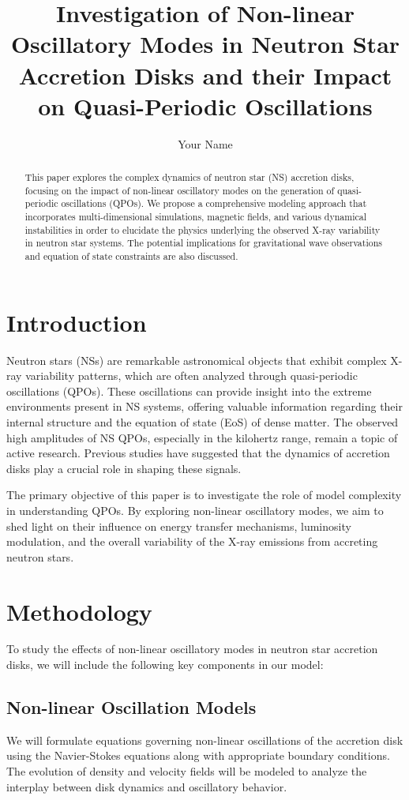 \documentclass[twocolumn]{aastex631}
\begin{document}
\title{Investigation of Non-linear Oscillatory Modes in Neutron Star Accretion Disks and their Impact on Quasi-Periodic Oscillations}

\author{Your Name}

\begin{abstract}
This paper explores the complex dynamics of neutron star (NS) accretion disks, focusing on the impact of non-linear oscillatory modes on the generation of quasi-periodic oscillations (QPOs). We propose a comprehensive modeling approach that incorporates multi-dimensional simulations, magnetic fields, and various dynamical instabilities in order to elucidate the physics underlying the observed X-ray variability in neutron star systems. The potential implications for gravitational wave observations and equation of state constraints are also discussed.
\end{abstract}

\section{Introduction}
Neutron stars (NSs) are remarkable astronomical objects that exhibit complex X-ray variability patterns, which are often analyzed through quasi-periodic oscillations (QPOs). These oscillations can provide insight into the extreme environments present in NS systems, offering valuable information regarding their internal structure and the equation of state (EoS) of dense matter. The observed high amplitudes of NS QPOs, especially in the kilohertz range, remain a topic of active research. Previous studies have suggested that the dynamics of accretion disks play a crucial role in shaping these signals.

The primary objective of this paper is to investigate the role of model complexity in understanding QPOs. By exploring non-linear oscillatory modes, we aim to shed light on their influence on energy transfer mechanisms, luminosity modulation, and the overall variability of the X-ray emissions from accreting neutron stars.

\section{Methodology}
To study the effects of non-linear oscillatory modes in neutron star accretion disks, we will include the following key components in our model:

\subsection{Non-linear Oscillation Models}
We will formulate equations governing non-linear oscillations of the accretion disk using the Navier-Stokes equations along with appropriate boundary conditions. The evolution of density and velocity fields will be modeled to analyze the interplay between disk dynamics and oscillatory behavior.
\end{document}
